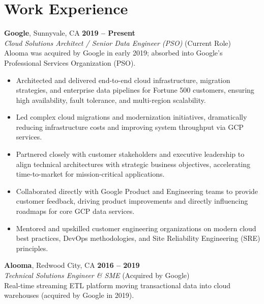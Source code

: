 \documentclass[10pt,letterpaper]{article}
\begin{document}
\section*{Work Experience}
\small
\noindent
\textbf{Google}, Sunnyvale, CA \hfill \textbf{2019 -- Present}\\
\textit{Cloud Solutions Architect / Senior Data Engineer (PSO)}  \hfill {\footnotesize \color{mutedtext} (Current Role)} \\
{\footnotesize \color{mutedtext} Alooma was acquired by Google in early 2019; absorbed into Google's Professional Services Organization (PSO).}\\[0.2em]
\begin{itemize}[leftmargin=1.2em, itemsep=1.5pt, topsep=2pt]
    \item Architected and delivered end-to-end cloud infrastructure, migration strategies, and enterprise data pipelines for Fortune 500 customers, ensuring high availability, fault tolerance, and multi-region scalability.
    \item Led complex cloud migrations and modernization initiatives, dramatically reducing infrastructure costs and improving system throughput via GCP services.
    \item Partnered closely with customer stakeholders and executive leadership to align technical architectures with strategic business objectives, accelerating time-to-market for mission-critical applications.
    \item Collaborated directly with Google Product and Engineering teams to provide customer feedback, driving product improvements and directly influencing roadmaps for core GCP data services.
    \item Mentored and upskilled customer engineering organizations on modern cloud best practices, DevOps methodologies, and Site Reliability Engineering (SRE) principles.
\end{itemize}
\vspace{0.4em}
\noindent
\textbf{Alooma}, Redwood City, CA \hfill \textbf{2016 -- 2019}\\
\textit{Technical Solutions Engineer \& SME}  \hfill {\footnotesize \color{mutedtext} (Acquired by Google)} \\
{\footnotesize \color{mutedtext} Real-time streaming ETL platform moving transactional data into cloud warehouses (acquired by Google in 2019).}\\[0.2em]
\end{document}
